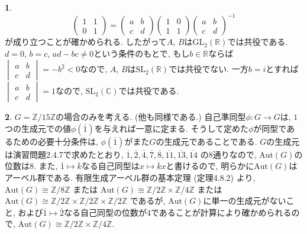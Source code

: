 \documentclass{article}
\theoremstyle{definition}
\newtheorem{ans}{}
\numberwithin{ans}{subsection}
\newcommand{\Z}[1]{\mathbb{Z}/#1\mathbb{Z}}
\begin{document}
\begin{ans}
  \[
    \begin{pmatrix}
      1 & 1 \\
      0 & 1
    \end{pmatrix} = \begin{pmatrix}
      a & b \\
      c & d
    \end{pmatrix} \begin{pmatrix}
      1 & 0 \\
      1 & 1
    \end{pmatrix} \begin{pmatrix}
      a & b \\
      c & d
    \end{pmatrix}^{-1}
  \]
  が成り立つことが確かめられる.
  したがって$A$, $B$は$\mathrm{GL}_2(\mathbb{R})$では共役である.
  $d = 0$, $b = c$, $ad - bc \neq 0$という条件のもとで, もし$b \in \mathbb{R}$ならば$
  \begin{vmatrix}
    a & b \\
    c & d
  \end{vmatrix} = - b^2 < 0
  $なので, $A$, $B$は$\mathrm{SL}_2(\mathbb{R})$では共役でない.
  一方$b = i$とすれば$
  \begin{vmatrix}
    a & b \\
    c & d
  \end{vmatrix} = 1
  $なので, $\mathrm{SL}_2(\mathbb{C})$では共役である.
\end{ans}

\begin{ans}
  $G = \Z{15}$の場合のみを考える. (他も同様である.)
  自己準同型$\phi: G \rightarrow G$は,
  $1$つの生成元での値$\phi(\overline{1})$を与えれば一意に定まる.
  そうして定めた$\phi$が同型であるための必要十分条件は, $\phi(\overline{1})$がまた$G$の生成元であることである.
  $G$の生成元は演習問題2.4.7で求めたとおり,
  $\overline{1}, \overline{2}, \overline{4}, \overline{7}, \overline{8}, \overline{11}, \overline{13}, \overline{14}$
  の$8$通りなので, $\mathrm{Aut}(G)$の位数は$8$.
  また, $\overline{1} \mapsto \overline{k}$なる自己同型は$x \mapsto \overline{k}x$と書けるので,
  明らかに$\mathrm{Aut}(G)$はアーベル群である.
  有限生成アーベル群の基本定理 (定理4.8.2) より,
  $\mathrm{Aut}(G) \cong \Z{8}$
  または
  $\mathrm{Aut}(G) \cong \Z{2} \times \Z{4}$
  または
  $\mathrm{Aut}(G) \cong \Z{2} \times \Z{2} \times \Z{2}$
  であるが, $\mathrm{Aut}(G)$に単一の生成元がないこと,
  および$\overline{1} \mapsto \overline{2}$なる自己同型の位数が$4$であることが計算により確かめられるので,
  $\mathrm{Aut}(G) \cong \Z{2} \times \Z{4}$.
\end{ans}
\end{document}
